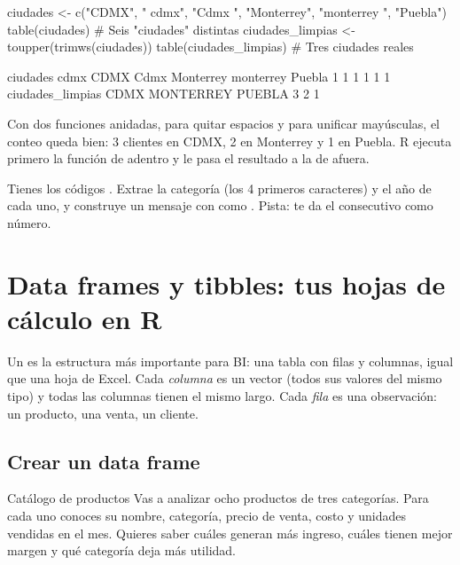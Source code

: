 \begin{rcode}
ciudades <- c("CDMX", " cdmx", "Cdmx ", "Monterrey", "monterrey ",
              "Puebla")
table(ciudades)                              # Seis "ciudades" distintas
ciudades_limpias <- toupper(trimws(ciudades))
table(ciudades_limpias)                      # Tres ciudades reales
\end{rcode}
\begin{rsalida}
ciudades
      cdmx       CDMX      Cdmx   Monterrey monterrey      Puebla 
         1          1          1          1          1          1 
ciudades_limpias
     CDMX MONTERREY    PUEBLA 
        3         2         1 
\end{rsalida}

Con dos funciones anidadas,  para quitar espacios y
 para unificar mayúsculas, el conteo queda bien: 3
clientes en CDMX, 2 en Monterrey y 1 en Puebla. R ejecuta primero la
función de adentro y le pasa el resultado a la de afuera.

\begin{hazlotu}
Tienes los códigos . Extrae la categoría (los 4 primeros caracteres) y el
año de cada uno, y construye un mensaje con  como
. Pista:
 te da el consecutivo como número.
\end{hazlotu}

\section{Data frames y tibbles: tus hojas de cálculo en R}
\label{sec:m1-dataframes}

Un  es la estructura más importante para BI: una tabla
con filas y columnas, igual que una hoja de Excel. Cada \emph{columna} es un
vector (todos sus valores del mismo tipo) y todas las columnas tienen el
mismo largo. Cada \emph{fila} es una observación: un producto, una venta,
un cliente.

\subsection{Crear un data frame}

\begin{ejemplo}{Catálogo de productos}
Vas a analizar ocho productos de tres categorías. Para cada uno conoces su
nombre, categoría, precio de venta, costo y unidades vendidas en el mes.
Quieres saber cuáles generan más ingreso, cuáles tienen mejor margen y
qué categoría deja más utilidad.
\end{ejemplo}

